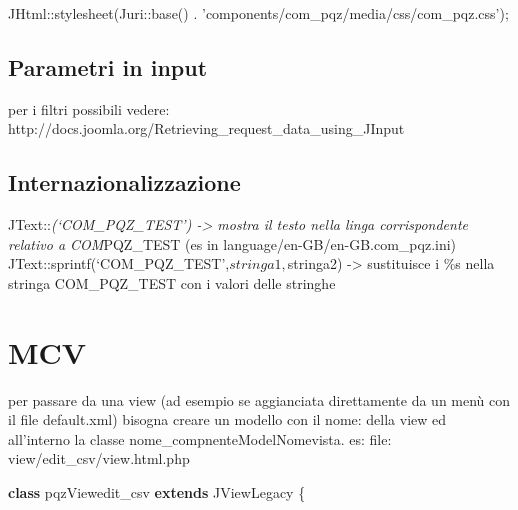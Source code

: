 \documentclass[]{article}
\newenvironment{Shaded}{}{}
\newcommand{\KeywordTok}[1]{\textcolor[rgb]{0.00,0.44,0.13}{\textbf{{#1}}}}
\newcommand{\StringTok}[1]{\textcolor[rgb]{0.25,0.44,0.63}{{#1}}}
\newcommand{\OtherTok}[1]{\textcolor[rgb]{0.00,0.44,0.13}{{#1}}}
\newcommand{\NormalTok}[1]{{#1}}
\begin{document}
\begin{Shaded}
\begin{Highlighting}[]
\NormalTok{JHtml::stylesheet}\OtherTok{(}\NormalTok{Juri::base}\OtherTok{()} \NormalTok{. }\StringTok{'components/com_pqz/media/css/com_pqz.css'}\OtherTok{);}
\end{Highlighting}
\end{Shaded}

\subsection{Parametri in input}\label{parametri-in-input}

\begin{Shaded}
\end{Shaded}

per i filtri possibili vedere:
http://docs.joomla.org/Retrieving\_request\_data\_using\_JInput

\subsection{Internazionalizzazione}\label{internazionalizzazione}

JText::\emph{(`COM\_PQZ\_TEST') -\textgreater{} mostra il testo nella
linga corrispondente relativo a COM}PQZ\_TEST (es in
language/en-GB/en-GB.com\_pqz.ini)
JText::sprintf(`COM\_PQZ\_TEST',$stringa1,$stringa2) -\textgreater{}
sustituisce i \%s nella stringa COM\_PQZ\_TEST con i valori delle
stringhe

\section{MCV}\label{mcv}

per passare da una view (ad esempio se aggianciata direttamente da un
menù con il file default.xml) bisogna creare un modello con il nome:
della view ed all'interno la classe nome\_compnenteModelNomevista. es:
file: view/edit\_csv/view.html.php

\begin{Shaded}
\begin{Highlighting}[]
\KeywordTok{class} \NormalTok{pqzViewedit_csv }\KeywordTok{extends} \NormalTok{JViewLegacy \{}
\end{Highlighting}
\end{Shaded}
\end{document}
